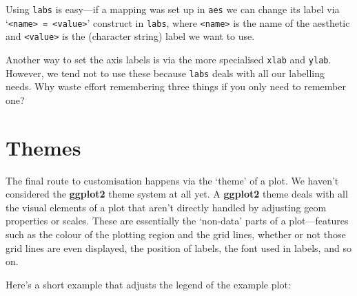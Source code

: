 \documentclass[
]{book}
\begin{document}
Using \texttt{labs} is easy---if a mapping was set up in \texttt{aes} we can change its label via `\texttt{\textless{}name\textgreater{}\ =\ \textless{}value\textgreater{}}' construct in \texttt{labs}, where \texttt{\textless{}name\textgreater{}} is the name of the aesthetic and \texttt{\textless{}value\textgreater{}} is the (character string) label we want to use.

Another way to set the axis labels is via the more specialised \texttt{xlab} and \texttt{ylab}. However, we tend not to use these because \texttt{labs} deals with all our labelling needs. Why waste effort remembering three things if you only need to remember one?

\hypertarget{themes}{%
\section{Themes}\label{themes}}

The final route to customisation happens via the `theme' of a plot. We haven't considered the \textbf{ggplot2} theme system at all yet. A \textbf{ggplot2} theme deals with all the visual elements of a plot that aren't directly handled by adjusting geom properties or scales. These are essentially the `non-data' parts of a plot---features such as the colour of the plotting region and the grid lines, whether or not those grid lines are even displayed, the position of labels, the font used in labels, and so on.

Here's a short example that adjusts the legend of the example plot:
\end{document}
